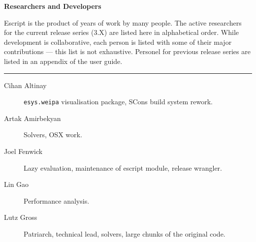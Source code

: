 \vbox{}
\vfill
\begin{center}
\textbf{\Large Researchers and Developers}
\vspace{0.5cm}

Escript is the product of years of work by many people.
The active researchers for the current release series (3.X) are listed here in alphabetical order.
While development is collaborative, each person is listed with some of their major contributions --- this list is not exhaustive.
Personel for previous release series are listed in an appendix of the user guide.

\vspace{1cm}
\hrule
\vspace{1cm}
\begin{description}
\item[Cihan Altinay] \texttt{esys.weipa} visualisation package, SCons build system rework.
\item[Artak Amirbekyan] Solvers, OSX work.
\item[Joel Fenwick] Lazy evaluation, maintenance of escript module, release wrangler.
\item[Lin Gao] Performance analysis.
\item[Lutz Gross] Patriarch, technical lead, solvers, large chunks of the original code.
\end{description}
\end{center}
\vfill
\pagebreak


